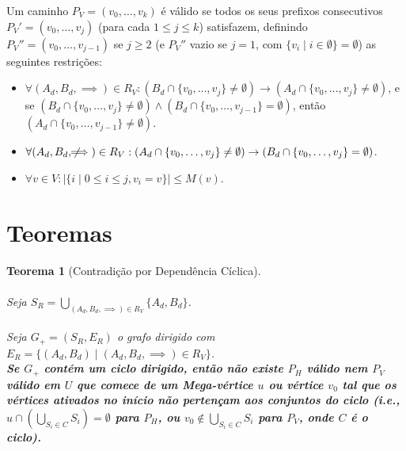 \documentclass{article}
\newtheorem{theorem}{Teorema}
\begin{document}
Um caminho \( P_V = (v_0, \dots, v_k) \) é válido se todos os seus prefixos consecutivos \( P_V' = (v_0, \dots, v_j) \) (para cada \( 1 \leq j \leq k \)) satisfazem, definindo \( P_V'' = (v_0, \dots, v_{j-1}) \) se \( j \geq 2 \) (e \( P_V'' \) vazio se \( j = 1 \), com \( \{v_i \mid i \in \emptyset \} = \emptyset \)) as seguintes restrições:

\begin{itemize}
    \item \( \forall (A_d, B_d, \implies) \in R_V: (B_d \cap \{v_0, \dots, v_j\} \neq \emptyset) \to (A_d \cap \{v_0, \dots, v_j\} \neq \emptyset) \), e se \( (B_d \cap \{v_0, \dots, v_j\} \neq \emptyset) \wedge (B_d \cap \{v_0, \dots, v_{j-1}\} = \emptyset) \), então \( (A_d \cap \{v_0, \dots, v_{j-1}\} \neq \emptyset) \).
    \item \( \forall (A_d, B_d, \not\!\!\!\implies) \in R_V: (A_d \cap \{v_0, \dots, v_j\} \neq \emptyset) \to (B_d \cap \{v_0, \dots, v_j\} = \emptyset) \).
    \item \( \forall v \in V: |\{ i \mid 0 \leq i \leq j, v_i = v \}| \leq M(v) \).
\end{itemize}

\section{Teoremas}

\begin{theorem}[Contradição por Dependência Cíclica]
\hfill
\\
\\
Seja \( S_R = \bigcup_{(A_d, B_d, \implies) \in R_V} \{ A_d, B_d \} \).
\\
\\
Seja \( G_{+} = (S_R, E_R) \) o grafo dirigido com \( E_R = \{ (A_d, B_d) \mid (A_d, B_d, \implies) \in R_V \} \).
\\

\textbf{Se \( G_{+} \) contém um ciclo dirigido, então não existe \( P_H \) válido nem \( P_V \) válido em \( U \) que comece de um Mega-vértice \( u \) ou vértice \( v_0 \) tal que os vértices ativados no início não pertençam aos conjuntos do ciclo (i.e., \( u \cap \left( \bigcup_{S_i \in C} S_i \right) = \emptyset \) para \( P_H \), ou \( v_0 \notin \bigcup_{S_i \in C} S_i \) para \( P_V \), onde \( C \) é o ciclo).}
\end{theorem}
\end{document}
